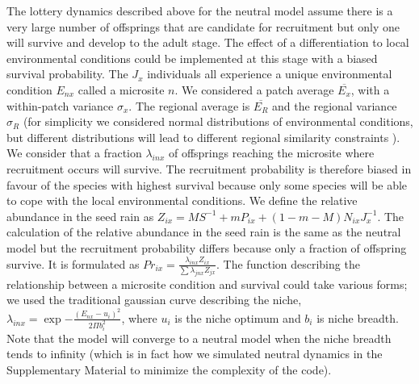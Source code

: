 \documentclass[12pt]{article}
\begin{document}
The lottery dynamics described above for the neutral model assume there is a
very large number of offsprings that are candidate for recruitment but only one
will survive and develop to the adult stage. The effect of a differentiation to
local environmental conditions could be implemented at this stage with a biased
survival probability. The $J_x$ individuals all experience a unique
environmental condition $E_{nx}$ called a microsite $n$. We considered a patch
average $\overline{E_x}$, with a within-patch variance $\sigma_x$. The regional
average is $\overline{E_R}$ and the regional variance $\sigma_R$ (for simplicity
we considered normal distributions of environmental conditions, but different
distributions will lead to different regional similarity constraints
\parencite{Mouquet2003,Tilman2004,Gravel2006}). We consider that a fraction
$\lambda_{inx}$ of offsprings reaching the microsite where recruitment occurs
will survive. The recruitment probability is therefore biased in favour of the
species with highest survival because only some species will be able to cope
with the local environmental conditions. We define the relative
abundance in the seed rain as $Z_{ix} = MS^{-1} + mP_{ix} +
(1-m-M)N_{ix}J_x^{-1}$. The calculation of the relative abundance in the seed
rain is the same as the neutral model but the recruitment probability differs
because only a fraction of offspring survive. It is formulated as $Pr_{ix} =
\frac{\lambda_{inx}Z_{ix}}{\sum \lambda_{jnx}Z_{jx}}$. The function describing
the relationship between a microsite condition and survival could take various
forms; we used the traditional gaussian curve describing the niche,
$\lambda_{inx} = \exp{-\frac{(E_{nx}-u_i)^2}{2\Pi b_i^2}}$, where $u_i$ is the
niche optimum and $b_i$ is niche breadth. Note that the model will converge to a
neutral model when the niche breadth tends to infinity (which is in fact how we
simulated neutral dynamics in the Supplementary Material to minimize the
complexity of the code).
\end{document}
